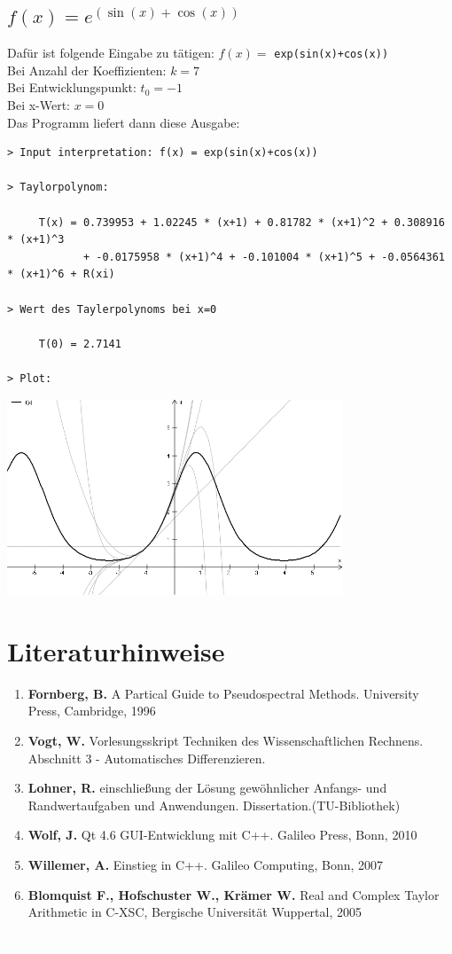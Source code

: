 \documentclass{scrartcl}
\begin{document}
	\subsection{$f(x)=e^{(\sin(x)+\cos(x))}$}
Dafür ist folgende Eingabe zu tätigen: $f(x)=$ \texttt{exp(sin(x)+cos(x))}\\
Bei Anzahl der Koeffizienten: $k=7$\\
Bei Entwicklungspunkt: $t_0=-1$\\
Bei x-Wert: $x=0$\\
Das Programm liefert dann diese Ausgabe:
\begin{verbatim}
> Input interpretation: f(x) = exp(sin(x)+cos(x))
 
> Taylorpolynom: 

     T(x) = 0.739953 + 1.02245 * (x+1) + 0.81782 * (x+1)^2 + 0.308916 * (x+1)^3
            + -0.0175958 * (x+1)^4 + -0.101004 * (x+1)^5 + -0.0564361 * (x+1)^6 + R(xi)

> Wert des Taylerpolynoms bei x=0

     T(0) = 2.7141

> Plot:
\end{verbatim}	
\begin{center}
\includegraphics[width=10cm]{./png/plot_expsincos.png}
\end{center}

	\newpage
\section{Literaturhinweise}
	\begin{enumerate}\item \textbf{Fornberg, B.} A Partical Guide to Pseudospectral Methods. University Press, Cambridge, 1996\\
	\item \textbf{Vogt, W.} Vorlesungsskript Techniken des Wissenschaftlichen Rechnens. Abschnitt 3 - Automatisches Differenzieren. \\
	\item \textbf{Lohner, R.} einschließung der Lösung gewöhnlicher Anfangs- und Randwertaufgaben und Anwendungen. Dissertation.(TU-Bibliothek)\\
	\item \textbf{Wolf, J.} Qt 4.6 GUI-Entwicklung mit C++. Galileo Press, Bonn, 2010\\
	\item \textbf{Willemer, A.} Einstieg in C++. Galileo Computing, Bonn, 2007
	\item \textbf{Blomquist F., Hofschuster W., Krämer W.} Real and Complex Taylor Arithmetic in C-XSC, Bergische Universität Wuppertal, 2005
	\end{enumerate}
        \textcolor{white}{bam}
\end{document}
